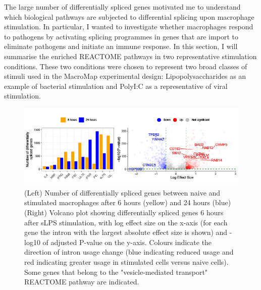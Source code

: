 The large number of differentially spliced genes motivated me to understand which biological pathways are subjected to differential splicing upon macrophage stimulation. In particular, I wanted to investigate whether macrophages respond to pathogens by activating splicing programmes in genes that are import to eliminate pathogens and initiate an immune response. In this section, I will summarise the enriched REACTOME pathways in two representative stimulation conditions. These two conditions were chosen to represent two broad classes of stimuli used in the MacroMap experimental design: Lipopolysaccharides as an example of bacterial stimulation and PolyI:C as a representative of viral stimulation.\\




\begin{figure}[H]
  \centering
  \includegraphics[width=\textwidth]{Vector/ds.png}
  \caption[Number of differentially spliced genes and volcano plot of differentially spliced genes in sLPS\_6]{(Left) Number of differentially spliced genes between naive and stimulated macrophages after 6 hours (yellow) and 24 hours (blue) (Right) Volcano plot showing differentially spliced genes 6 hours after sLPS stimulation, with log effect size on the x-axis (for each gene the intron with the largest absolute effect size is shown) and -log10 of adjusted P-value on the y-axis. Colours indicate the direction of intron usage change (blue indicating reduced usage and red indicating greater usage in stimulated cells versus naive cells). Some genes that belong to the "vesicle-mediated transport" REACTOME pathway are indicated.}
  \label{fig:ds}   
\end{figure}
